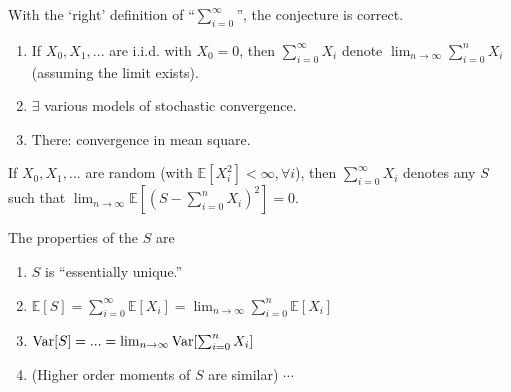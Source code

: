 \documentclass[11pt]{elegantbook}
\begin{document}
\begin{claim}
    With the `right' definition of ``$\sum_{i=0}^{\infty}$'', the conjecture is correct.
\end{claim}
\begin{remark}
    \begin{enumerate}
        \item If $X_0,X_1,...$ are i.i.d. with $X_0=0$, then $\sum_{i=0}^\infty X_i$ denote $\lim_{n \rightarrow \infty}\sum_{i=0}^n X_i$ (assuming the limit exists).
        \item $\exists$ various models of stochastic convergence.
        \item There: convergence in mean square.
    \end{enumerate}
\end{remark}
\begin{definition}
    If $X_0,X_1,...$ are random (with $\mathbb{E}[X_i^2]<\infty,\forall i$), then $\sum_{i=0}^\infty X_i$ denotes any $S$ such that $\lim_{n \rightarrow \infty}\mathbb{E}[(S-\sum_{i=0}^n X_i)^2]=0$.
\end{definition}
\begin{lemma}
    The properties of the $S$ are
    \begin{enumerate}
        \item $S$ is ``essentially unique.''
        \item $\mathbb{E}[S]=\sum_{i=0}^\infty \mathbb{E}[X_i]=\lim_{n \rightarrow \infty}\sum_{i=0}^n \mathbb{E}[X_i]$
        \item $\textnormal{Var}[S]=...=\lim_{n \rightarrow \infty}\textnormal{Var}[\sum_{i=0}^n X_i]$
        \item (Higher order moments of $S$ are similar) $\cdots$
    \end{enumerate}
\end{lemma}
\end{document}
